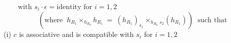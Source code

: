 $\qquad\text{with } s_i \cdot \epsilon = \text{identity for } i = 1,2$
\begin{equation*}
(\text{where } \ h_{R_1} \times_{h_{R_0}} h_{R_1} \ = \ (h_{R_1})_{s_1} \times_{h_{R_0}} {}_{s_2}(h_{R_1})) \ \text{ such that}
\end{equation*}
(i)  $c$  is associative and is compatible with  $s_i$  for  $i = 1,2$

